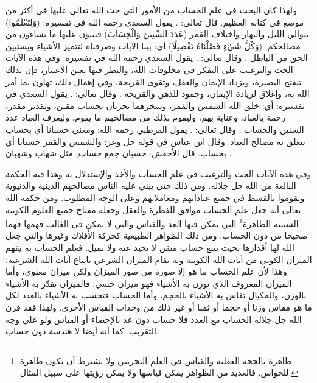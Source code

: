 ولهذا كان البحث في علم الحساب من الأمور التي حث الله تعالى عليها في أكثر من موضع في كتابه العظيم. قال تعالى: \quranayah*[17][12]{\footnotesize \surahname*[17]}. يقول السعدي رحمه الله في تفسيره: (وَلِتَعْلَمُوا) بتوالي الليل والنهار واختلاف القمر (عَدَدَ السِّنِينَ وَالْحِسَابَ) فتبنون عليها ما تشاءون من مصالحكم. (وَكُلَّ شَيْءٍ فَصَّلْنَاهُ تَفْصِيلًا) أي: بينا الآيات وصرفناه لتتميز الأشياء ويستبين الحق من الباطل \href{https://shamela.ws/book/42/1001#p1}{\faExternalLink} \cite{tafsir_Saadi}. وقال تعالى: \quranayah*[10][5]{\footnotesize \surahname*[10]}. يقول السعدي رحمه الله في تفسيره: وفي هذه الآيات الحث والترغيب على التفكر في مخلوقات الله، والنظر فيها بعين الاعتبار، فإن بذلك تنفتح البصيرة، ويزداد الإيمان والعقل، وتقوى القريحة، وفي إهمال ذلك، تهاون بما أمر الله به، وإغلاق لزيادة الإيمان، وجمود للذهن والقريحة \href{https://shamela.ws/book/42/729#p6}{\faExternalLink} \cite{tafsir_Saadi}. وقال تعالى: \quranayah*[55][5]{\footnotesize \surahname*[55]}. يقول السعدي في تفسيره: أي: خلق الله الشمس والقمر، وسخرهما يجريان بحساب مقنن، وتقدير مقدر، رحمة بالعباد، وعناية بهم، وليقوم بذلك من مصالحهم ما يقوم، وليعرف العباد عدد السنين والحساب \href{https://shamela.ws/book/42/1887#p6}{\faExternalLink} \cite{tafsir_Saadi}. وقال تعالى: \quranayah*[6][96]{\footnotesize \surahname*[6]}. يقول القرطبي رحمه الله: ومعنى حسبانا أي بحساب يتعلق به مصالح العباد. وقال ابن عباس في قوله جل وعز: والشمس والقمر حسبانا أي بحساب. قال الأخفش: حسبان جمع حساب; مثل شهاب وشهبان \href{https://shamela.ws/book/20855/2582#p1}{\faExternalLink} \cite{tafsir_Qurtubi}.

وفي هذه الآيات الحث والترغيب في علم الحساب والأخذ والإستدلال به وهذا فيه الحكمة البالغة من الله جل جلاله. ومن ذلك حتى يبني عليه الناس مصالحهم الدينية والدنيوية ويقوموا بالقسط في جميع عباداتهم ومعاملاتهم وعلى الوجه المطلوب. ومن حكمة الله تعالى أنه جعل علم الحساب موافق للفطرة والعقل وجعله مفتاح جميع العلوم الكونية السببية الظاهرة\footnote{ظاهرة بالحجة العقلية والقياس في العلم التجريبي ولا يشترط أن تكون ظاهرة للحواس. فالعديد من الظواهر يمكن قياسها ولا يمكن رؤيتها على سبيل المثال.} التي يمكن فيها العد والقياس والتي لا يمكن في الغالب فهمها فهما صحيحا من دون الحساب. ومن ذلك الظواهر الطبيعية كحركة الأفلاك وغيرها والتي جعل الله لها أقدارها بحيث تتبع حساب متقن لا تحيد عنه ولا تميل. فعلم الحساب به يفهم الميزان الكوني من آيات الله الكونية وبه يقام الميزان الشرعي باتباع آيات الله الشرعية. وهذا لأن علم الحساب ما هو إلا صورة من صور الميزان ولكن ميزان معنوى، وأما الميزان المعروف الذي توزن به الأشياء فهو ميزان حسي. فالميزان تقدّر به الأشياء بالوزن، والمكيال تقاس به الأشياء بالحجم، وأما الحساب فتحسب به الأشياء بالعدد لكل ما هو مقاس وزنا أو حجما أو ثمنا أو غير ذلك من وحدات القياس الأخرى. ولهذا فقد قرن الله جل جلاله الحساب مع العدد فلا حساب دون عد بالإحصاء أو القياس ولو على وجه التقريب. كما أنه أيضا لا هندسة دون حساب.

